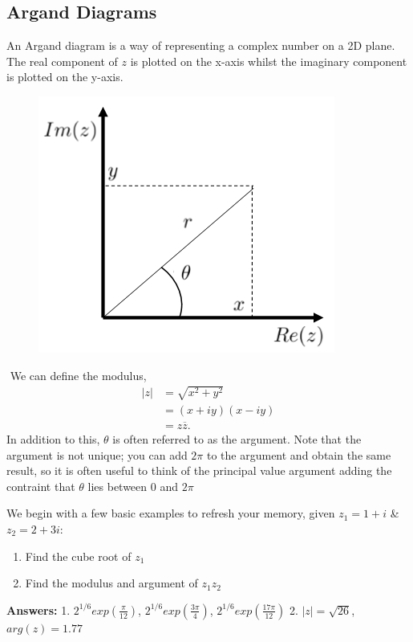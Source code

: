 \subsection{Argand Diagrams}
An Argand diagram is a way of representing a complex number on a 2D plane.
 The real component of $z$ is plotted on the x-axis whilst the imaginary component is plotted on the y-axis.
%
\begin{minipage}[t]{0.47\linewidth}
	\begin{figure}[H]
 		\centering
 		\includegraphics[width=\linewidth]{complex/argand}
 		\captionsetup{font=small} 	
	\end{figure} 
\end{minipage}
\hspace{0.6cm}
%
\begin{minipage}[t]{0.47\linewidth}\(\)
	\vspace{1cm}
	We can define the modulus, 
	\begin{align*}
		|z| &= \sqrt{x^2+y^2} \\
		&= (x+iy)(x-iy) \\
		&= z\overline{z}.
	\end{align*}
	In addition to this, $\theta$ is often referred to as the argument.
	 Note that the argument is not unique; you can add $2\pi$ to the argument and obtain the same result, so it is often useful to think of the principal value argument adding the contraint that $\theta$ lies between $0$ and $2\pi$
\end{minipage}
%
\begin{examples}
	We begin with a few basic examples to refresh your memory, given $z_1=1+i$ \& $z_2=2+3i$:
	\begin{enumerate}
		\item Find the cube root of $z_1$
		\item Find the modulus and argument of $z_1z_2$
	\end{enumerate}
\textbf{Answers:} 1. $2^{1/6}exp(\frac{\pi}{12})$, $2^{1/6}exp(\frac{3\pi}{4})$, $2^{1/6}exp(\frac{17\pi}{12})$ \hspace{0.5cm}
2. $|z| = \sqrt{26}$, $arg(z)=1.77$
\end{examples}
%
